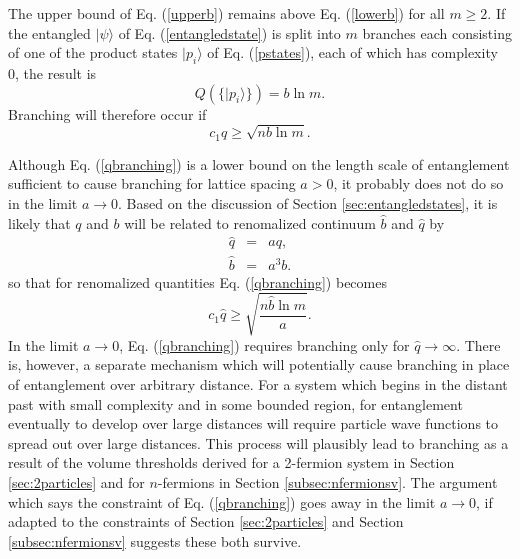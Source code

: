 \documentclass[12pt,amsmath,amssymb,onecolumn]{revtex4-2}
\begin{document}
The upper bound of Eq. (\ref{upperb}) remains above Eq. (\ref{lowerb}) for all
$m \ge 2$. If the entangled $|\psi \rangle $ of Eq. (\ref{entangledstate}) is split
into $m$ branches each consisting of one of the product states $|p_i \rangle $ of Eq. (\ref{pstates}),
each of which has complexity 0, the result is
\begin{equation}
  \label{splitintoproducts}
  Q( \{ |p_i \rangle  \}) = b \ln m.
\end{equation}
Branching will therefore occur if
\begin{equation}
  \label{qbranching}
  c_1 q \ge \sqrt{n b \ln m}.
\end{equation}

Although Eq. (\ref{qbranching}) is a lower bound
on the length scale of entanglement sufficient to cause branching
for lattice spacing $a > 0$, it probably does not do so in
the limit $a \rightarrow 0$. Based on the discussion
of 
Section \ref{sec:entangledstates}, it is likely that
$q$ and $b$ will be related to renomalized continuum
$\hat{b}$ and $\hat{q}$ by
\begin{subequations}
  \begin{eqnarray}
    \label{renormq}
    \hat{q} & = & a q, \\
    \label{renormb}
     \hat{b} &  = & a^3 b.
  \end{eqnarray}
\end{subequations}
so that for renomalized quantities Eq. (\ref{qbranching}) becomes
\begin{equation}
  \label{qbranchingr}
  c_1 \hat{q} \ge \sqrt{\frac{n \hat{b} \ln m}{a}}.
\end{equation}
In
the limit $a \rightarrow 0$,
Eq. (\ref{qbranching}) requires branching
only for $\hat{q} \rightarrow \infty$.
There is, however, a separate
mechanism which will potentially
cause branching in place of
entanglement over arbitrary distance.
For a system which
begins in the distant past with
small complexity and in some bounded region,
for entanglement eventually to develop over
large distances will require particle
wave functions to spread out over large
distances.
This process will
plausibly lead to branching as a result
of the volume thresholds derived for a
2-fermion system in Section
\ref{sec:2particles} and
for $n$-fermions in Section \ref{subsec:nfermionsv}.
The argument which says the constraint of
Eq. (\ref{qbranching}) goes away in the limit
$a \rightarrow 0$, if adapted to
the constraints of Section
\ref{sec:2particles} and Section \ref{subsec:nfermionsv}
suggests these both survive.
\end{document}
